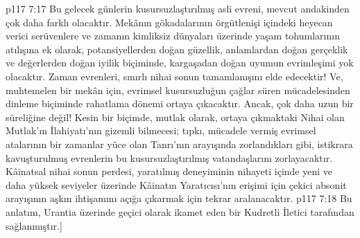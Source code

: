 \vs p117 7:17 Bu gelecek günlerin kusursuzlaştırılmış asli evreni, mevcut andakinden çok daha farklı olacaktır. Mekânın gökadalarının örgütlenişi içindeki heyecan verici serüvenlere ve zamanın kimliksiz dünyaları üzerinde yaşam tohumlarının atılışına ek olarak, potansiyellerden doğan güzellik, anlamlardan doğan gerçeklik ve değerlerden doğan iyilik biçiminde, kargaşadan doğan uyumun evrimleşimi yok olacaktır. Zaman evrenleri, sınırlı nihai sonun tamamlanışını elde edecektir! Ve, muhtemelen bir mekân için, evrimsel kusursuzluğun çağlar süren mücadelesinden dinleme biçiminde rahatlama dönemi ortaya çıkacaktır. Ancak, çok daha uzun bir süreliğine değil! Kesin bir biçimde, mutlak olarak, ortaya çıkmaktaki Nihai olan Mutlak’ın İlahiyatı’nın gizemli bilmecesi; tıpkı, mücadele vermiş evrimsel atalarının bir zamanlar yüce olan Tanrı’nın arayışında zorlandıkları gibi, istikrara kavuşturulmuş evrenlerin bu kusursuzlaştırılmış vatandaşlarını zorlayacaktır. Kâinatsal nihai sonun perdesi, yaratılmış deneyiminin nihayeti içinde yeni ve daha yüksek seviyeler üzerinde Kâinatın Yaratıcısı’nın erişimi için çekici absonit arayışının aşkın ihtişamını açığa çıkarmak için tekrar aralanacaktır.
\vs p117 7:18 Bu anlatım, Urantia üzerinde geçici olarak ikamet eden bir Kudretli İletici tarafından sağlanmıştır.]
